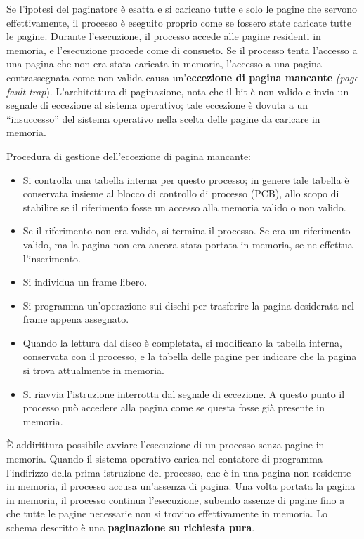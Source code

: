 \documentclass[11pt,a4paper]{article}
\begin{document}
Se l'ipotesi del paginatore è esatta e si carica­no tutte e solo le pagine che servono effettivamente, il processo è eseguito proprio come se
fossero state caricate tutte le pagine. Durante l'esecuzione, il processo accede alle pagine re­sidenti in memoria, e l'esecuzione procede come di consueto.
Se il processo tenta l'accesso a una pagina che non era stata caricata in memoria, l'ac­cesso a una pagina contrassegnata come non valida causa un'\textbf{eccezione di pagina mancante}
\emph{(page fault trap}). L'architettura di paginazione, nota che il bit è non valido e invia un segnale di eccezione al sistema operati­vo; tale eccezione è dovuta a un “insuccesso” del sistema operativo nella scelta delle pagine da caricare in memoria.

Procedura di gestione dell'eccezione di pagina mancante:
\begin{itemize}
  \item Si controlla una tabella interna per questo processo; in genere tale tabella è conservata insieme al blocco di controllo di processo (PCB), allo scopo di stabilire se il riferimen­to fosse un accesso alla memoria valido o non valido.
  \item Se il riferimento non era valido, si termina il processo. Se era un riferimento valido, ma la pagina non era ancora stata portata in memoria, se ne effettua l'inserimento.
  \item Si individua un frame libero.
  \item Si programma un'operazione sui dischi per trasferire la pagina desiderata nel frame ap­pena assegnato.
  \item Quando la lettura dal disco è completata, si modificano la tabella interna, conservata con il processo, e la tabella delle pagine per indicare che la pagina si trova attualmente in memoria.
  \item Si riavvia l'istruzione interrotta dal segnale di eccezione. A questo punto il processo può accedere alla pagina come se questa fosse già presente in memoria.
\end{itemize}
È addirittura possibile avviare l'esecuzione di un processo senza pagine in memoria. Quan­do il sistema operativo carica nel contatore di programma l'indirizzo della prima istruzione
del processo, che è in una pagina non residente in memoria, il processo accusa un'assenza di
pagina. Una volta portata la pagina in memoria, il processo continua l'esecuzione, subendo
assenze di pagine fino a che tutte le pagine necessarie non si trovino effettivamente in me­moria. Lo schema de­scritto è una \textbf{paginazione su richiesta pura}.
\end{document}
